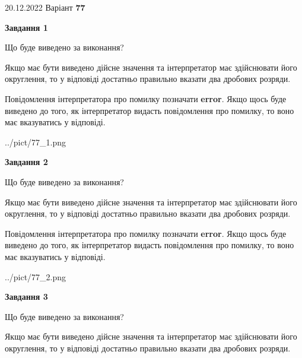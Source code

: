 \documentclass[12pt, ukrainian]{article}
\begin{document}
{20.12.2022 Варіант \No \textbf { 77 }\par}
{
\begin {Large}

{\begin {center}\textbf{Завдання 1}\end {center}}\par
Що буде виведено за виконання? \par

Якщо має бути виведено дійсне значення та інтерпретатор має здійснювати його округлення, 
то у відповіді достатньо правильно вказати два дробових розряди.

Повідомлення інтерпретатора про помилку позначати \textbf{error}.
Якщо щось буде виведено до того, як інтерпретатор видасть повідомлення про помилку, 
то воно має вказуватись у відповіді. \par

\begin{center}
	{../pict/77_1.png}
\end{center}
\newpage

{\begin {center}\textbf{Завдання 2}\end {center}}\par
Що буде виведено за виконання? \par

Якщо має бути виведено дійсне значення та інтерпретатор має здійснювати його округлення, 
то у відповіді достатньо правильно вказати два дробових розряди.

Повідомлення інтерпретатора про помилку позначати \textbf{error}.
Якщо щось буде виведено до того, як інтерпретатор видасть повідомлення про помилку, 
то воно має вказуватись у відповіді. \par

\begin{center}
	{../pict/77_2.png}
\end{center}
\newpage

{\begin {center}\textbf{Завдання 3}\end {center}}\par
Що буде виведено за виконання? \par

Якщо має бути виведено дійсне значення та інтерпретатор має здійснювати його округлення, 
то у відповіді достатньо правильно вказати два дробових розряди.


\end{Large}}
\end{document}
